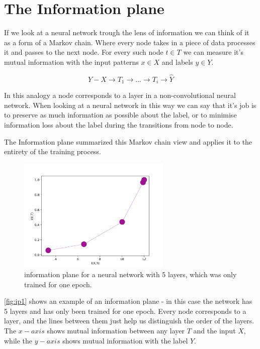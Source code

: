 \section{The Information plane}

If we look at a neural network trough the lens of information we can think of it
as a form of a Markov chain. Where every node takes in a piece of data processes
it and passes to the next node. For every such node $ t \in T $ we can measure
it's mutual information with the input patterns $ x \in X $ and labels $ y \in Y
$. 

$$ Y - X \rightarrow T_1 \rightarrow ... \rightarrow T_i \rightarrow \hat{Y} $$

In this analogy a node corresponds to a layer in a non-convolutional neural
network. When looking at a neural network in this way we can say that it's job
is to preserve as much information as possible about the label, or to minimise
information loss about the label during the transitions from node to node.

The Information plane summarized this Markov chain view and applies it to the
entirety of the training process.

\begin{figure}[H]
  \centering
  \includegraphics[width=0.65\textwidth]{figs/ip_1v2.png}
  \caption{
    information plane for a neural network with 5 layers, which was only trained
    for one epoch.
  }
  \label{fig:ip1}
\end{figure}

\autoref{fig:ip1} shows an example of an information plane - in this case the
network has 5 layers and has only been trained for one epoch. Every node
corresponds to a layer, and the lines between them just help us distinguish the
order of the layers. The $ x-axis $ shows mutual information between any layer $
T $ and the input $ X $, while the $ y-axis $ shows mutual information with the
label $ Y $.

